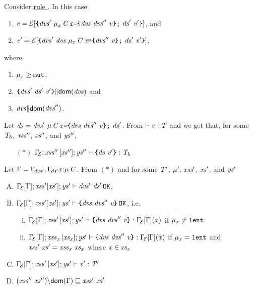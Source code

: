 \medskip\noindent
Consider \underline{rule }.
In this case  
\begin{enumerate}[(1)]
\item $\e=\Ctx{\Block{\dvs'\ \Dec{\Type{\mu_x}{\C}}{\x}{\Block{\dvs\ \dvs''}{\val}}\ \decs'}{\val'}}$, and 
\item $\e'=\Ctx{\Block{\dvs'\ \dvs\ \Dec{\Type{\mu_x}{\C}}{\x}{\Block{\dvs''}{\val}}\ \decs'}{\val'}}$, 
\end{enumerate}
where 
\begin{enumerate}[(1)]\addtocounter{enumi}{2}
\item $\mu_x \geq \texttt{mut}$,  
\item $\noCapture{\Block{\dvs'\ \decs'}{\val'}}{\dom{\dvs}}$ and 
\item $\mathit{dvs}{\parallel}\textsf{dom}(\mathit{dvs}'')$. 
\end{enumerate}
Let $\decs=\dvs'\ \Dec{\Type{\mu}{\C}}{\x}{\Block{\dvs\ \dvs''}{\val}}\ \decs'$. From $\vdash {\mathit{e}}:\mathit{T}$ and  we get that, for some $\mathit{T}_b$, $\mathit{xss}''$, $\mathit{xs}''$, and $\mathit{ys}''$,
\begin{itemize}
  \item [$(\ast)$]$\Gamma_{\!{\cal{E}}};\mathit{xss}''\,[\mathit{xs}''];\mathit{ys}''\vdash \texttt{\{}\mathit{ds}\ \mathit{v}'\texttt{\}}:\mathit{T}_b$
\end{itemize}
Let $\Gamma=\Gamma_{\!\mathit{dvs}'},\Gamma_{\!\mathit{ds}'}x{:}\mu\,\mathit{C}$. 
From $(\ast)$ and   for some $\mathit{T}'$, $\mu'$, $\mathit{xss}'$, $\mathit{xs}'$, and $\mathit{ys}'$
\begin{enumerate} [(A)]
\item $\AuxDecsOK{{\SubstFun{\TypeEnv{\ctx}}{\Gamma}}}{\LentLocked'}{\MutGroup'}{\StronglyLocked'}{\dvs'\ \decs'}$,
\item $\AuxDecsOK{{\SubstFun{\TypeEnv{\ctx}}{\Gamma}}}{\LentLocked'}{\MutGroup'}{\StronglyLocked'}{{\Block{\dvs\ \dvs''}{\val}}}$, i.e.
\begin{enumerate}[i.]
\item $\AuxTypeCheck{{\SubstFun{\TypeEnv{\ctx}}{\Gamma}}}{\LentLocked'}{\MutGroup'}{\StronglyLocked'}{{\Block{\dvs\ \dvs''}{\val}}}{{\SubstFun{\TypeEnv{\ctx}}{\Gamma}}(\x)}$ if $\mu_x\neq\texttt{lent}$
\item $\AuxTypeCheck{{\SubstFun{\TypeEnv{\ctx}}{\Gamma}}}{\LentLocked_x}{\MutGroup_x}{\StronglyLocked'}{{\Block{\dvs\ \dvs''}{\val}}}{{\SubstFun{\TypeEnv{\ctx}}{\Gamma}}(\x)}$ if $\mu_x=\texttt{lent}$ and $\mathit{xss}'\ \mathit{xs}'=\mathit{xss}_x\ \mathit{xs}_x$ where $\mathit{x}\in\mathit{xs}_x$
\end{enumerate}
\item $\Gamma_{\!{\cal{E}}}[\Gamma];\mathit{xss}'\,[\mathit{xs}'];\mathit{ys}'\vdash \mathit{v}':\mathit{T}'$ 
\item $\LessEq{(\LentLocked''\ \xs''){\setminus}\dom{\Gamma}}{\LentLocked'\ \xs'}$
\end{enumerate}
